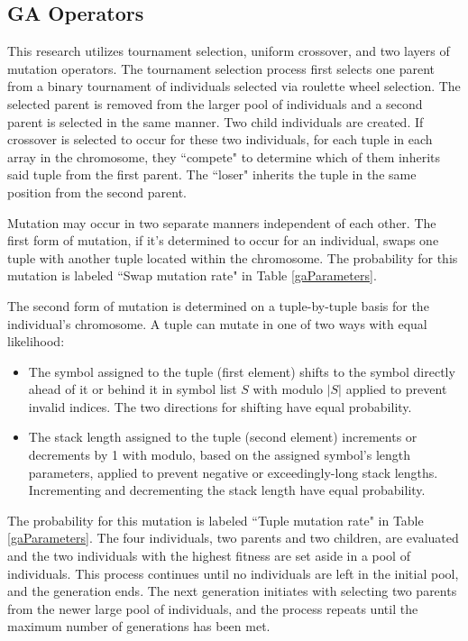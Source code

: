 \documentclass[conference]{IEEEtran}
\begin{document}
\subsection{GA Operators}
This research utilizes tournament selection, uniform crossover, and two layers of mutation operators.
The tournament selection process first selects one parent from a binary tournament of individuals selected via roulette wheel selection.
The selected parent is removed from the larger pool of individuals and a second parent is selected in the same manner.
Two child individuals are created.
If crossover is selected to occur for these two individuals, for each tuple in each array in the chromosome, they ``compete" to determine which of them inherits said tuple from the first parent.
The ``loser" inherits the tuple in the same position from the second parent.
\par
Mutation may occur in two separate manners independent of each other.
The first form of mutation, if it's determined to occur for an individual, swaps one tuple with another tuple located within the chromosome.
The probability for this mutation is labeled ``Swap mutation rate" in Table \ref{gaParameters}.
\par
The second form of mutation is determined on a tuple-by-tuple basis for the individual's chromosome.
A tuple can mutate in one of two ways with equal likelihood:
\begin{itemize}
\item The symbol assigned to the tuple (first element) shifts to the symbol directly ahead of it or behind it in symbol list $S$ with modulo $|S|$ applied to prevent invalid indices. The two directions for shifting have equal probability.
\item The stack length assigned to the tuple (second element) increments or decrements by 1 with modulo, based on the assigned symbol's length parameters, applied to prevent negative or exceedingly-long stack lengths. Incrementing and decrementing the stack length have equal probability.
\end{itemize}
The probability for this mutation is labeled ``Tuple mutation rate" in Table \ref{gaParameters}.
The four individuals, two parents and two children, are evaluated and the two individuals with the highest fitness are set aside in a pool of individuals.
This process continues until no individuals are left in the initial pool, and the generation ends.
The next generation initiates with selecting two parents from the newer large pool of individuals, and the process repeats until the maximum number of generations has been met.
\end{document}
